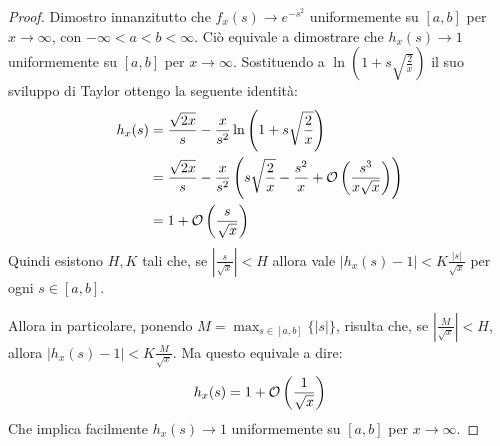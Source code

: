 \begin{proof}
	Dimostro innanzitutto che $f_x(s)\to e^{-s^2}$ uniformemente su $[a,b]$ per $x\to\infty$, con 
	$-\infty<a<b<\infty$. Ciò equivale a dimostrare che $h_x(s)\to 1$ uniformemente su $[a,b]$ per $x\to\infty$.
	Sostituendo a $\ln\left(1+s\sqrt{\frac{2}{x}}\right)$ il suo sviluppo di Taylor ottengo la seguente identità:
	\begin{equation*}
	\begin{split}
		h_x(s)	& =\frac{\sqrt{2x}}{s}-\frac{x}{s^2}\ln\left(1+s\sqrt{\frac{2}{x}}\right)\\
				& =\frac{\sqrt{2x}}{s}-\frac{x}{s^2}\left(s\sqrt{\frac{2}{x}}-\frac{s^2}{x}+\mathcal{O}\left(\frac{s^3}{x\sqrt{x}}\right) \right)\\
				& =1+\mathcal{O}\left( \frac{s}{\sqrt{x}} \right)
	\end{split}
	\end{equation*}
	Quindi esistono $H,K$ tali che, se $\left\lvert\frac s{\sqrt x}\right\rvert<H$ allora vale 
	$|h_x(s)-1|<K\frac{|s|}{\sqrt{x}}$ per ogni $s\in [a,b]$.
	
	Allora in particolare, ponendo $M=\max_{s\in[a,b]}\{|s|\}$, risulta che, se $\left\lvert\frac M{\sqrt x}\right\rvert<H$,
	allora $|h_x(s)-1|<K\frac{M}{\sqrt{x}}$. Ma questo equivale a dire:
	\begin{equation*}
		h_x(s)=1+\mathcal{O}\left( \frac{1}{\sqrt{x}} \right)
	\end{equation*}
	Che implica facilmente $h_x(s)\to 1$ uniformemente su $[a,b]$ per $x\to\infty$.
	

\end{proof}

